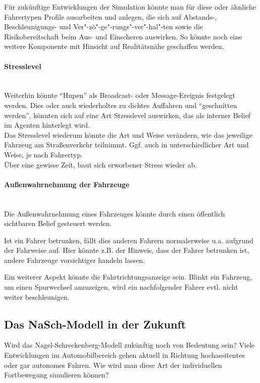 Für zukünftige Entwicklungen der Simulation könnte man für diese oder ähnliche Fahrertypen Profile ausarbeiten und anlegen, die sich auf Abstands-, Beschleunigungs- und Ver"-zö"-ge"-rungs"-ver"-hal"-ten sowie die Risikobereitschaft beim Aus- und Einscheren auswirken.
So könnte noch eine weitere Komponente mit Hinsicht auf Realitätsnähe geschaffen werden. 

\paragraph*{Stresslevel}
\hfill \\
Weiterhin könnte \enquote{Hupen} als Broadcast- oder Message-Ereignis festgelegt werden.
Dies oder auch wiederholtes zu dichtes Auffahren und \enquote{geschnitten werden}, könnten sich auf eine Art Stresslevel auswirken, das als interner Belief im Agenten hinterlegt wird.
\\
Das Stresslevel wiederum könnte die Art und Weise verändern, wie das jeweilige Fahrzeug am Straßenverkehr teilnimmt. 
Ggf. auch in unterschiedlicher Art und Weise, je nach Fahrertyp.
\\
Über eine gewisse Zeit, baut sich erworbener Stress wieder ab.

\paragraph*{Außenwahrnehmung der Fahrzeuge}
\hfill \\
Die Außenwahrnehmung eines Fahrzeuges könnte durch einen öffentlich sichtbaren Belief gesteuert werden. 

Ist ein Fahrer betrunken, fällt dies anderen Fahrern normalerweise u.a. aufgrund der Fahrweise auf.
Hier könnte z.B. der Hinweis, dass der Fahrer betrunken ist, andere Fahrzeuge vorsichtiger handeln lassen.

Ein weiterer Aspekt könnte die Fahrtrichtungsanzeige sein.
Blinkt ein Fahrzeug, um einen Spurwechsel anzuzeigen, wird ein nachfolgender Fahrer evtl. nicht weiter beschleunigen. 





\subsection{Das NaSch-Modell in der Zukunft}
Wird das Nagel-Schreckenberg-Modell zukünftig noch von Bedeutung sein? 
Viele Entwicklungen im Automobilbereich gehen aktuell in Richtung hochassitentes oder gar autonomes Fahren.
Wie wird man diese Art der individuellen Fortbewegung simulieren können?

